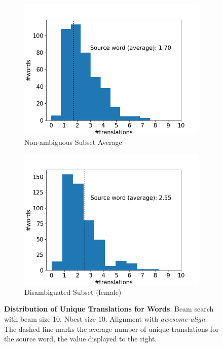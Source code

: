 \begin{figure}[!htb]
\begin{subfigure}{0.49\textwidth}
         \label{fig:alignment_translation_male}
     \end{subfigure}
     \begin{subfigure}{0.49\textwidth}
         \centering
         \includegraphics[width=\textwidth]{figures/alignment/align_10/word_translations_average.png}
         \caption{Non-ambiguous Subset Average}
         \label{fig:alignment_translation_common}
     \end{subfigure}
     \hfill
     \begin{subfigure}{0.49\textwidth}
         \centering
         \includegraphics[width=\textwidth]{figures/alignment/align_10/word_translations_female.png}
         \caption{Disambiguated Subset (female)}
         \label{fig:alignment_translation_female}
     \end{subfigure}
        \caption{\textbf{Distribution of Unique Translations for Words}. Beam search with beam size 10. Nbest size 10. Alignment with \textit{awesome-align}. The dashed line marks the average number of unique translations for the source word, the value displayed to the right.}
        \label{fig:alignment_graphs_translation_10}

\end{figure}

